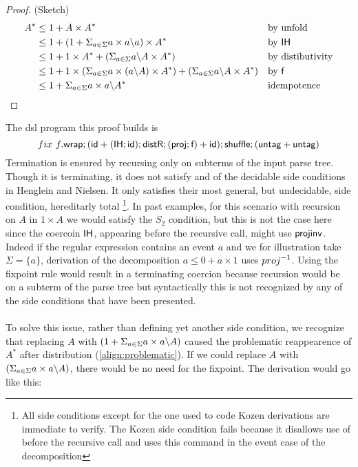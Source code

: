 \documentclass[a4paper,UKenglish,cleveref, autoref, thm-restate]{lipics-v2021}
\newcommand\mycomment[1]{}
\begin{document}
\begin{proof} (Sketch)
\begin{align}
A^* &\leq  1 + A \times A^* && \text{by unfold}\\
 &\leq 1 + (1 + \Sigma_{a \in \Sigma} a\times a \backslash a) \times A^* && \text{by } \textsf{IH}\\
 &\leq 1 + 1 \times A^* + (\Sigma_{a \in \Sigma} a \backslash A \times A^*) && \text{by distibutivity}\\
 &\leq 1 +  1 \times (\Sigma_{a \in \Sigma} a\times (a \backslash A)\times A^*) +  (\Sigma_{a \in \Sigma} a \backslash A \times A^*)  && \text{by } \textsf{f}  \\
 &\leq 1 + \Sigma_{a \in \Sigma} a\times a \backslash A^* && \text{idempotence} 
\end{align}
\end{proof}
The dsl program this proof builds is \mycomment{did not check details}
\[ \fix ~f.\dslcom{wrap};(\dslcom{id} + (\dslcom{IH};\dslcom {id});\dslcom{distR};(\dslcom{proj};\dslcom{f})+\dslcom{id});\dslcom{shuffle};(\dslcom{untag} + \dslcom{untag}) \]
Termination is ensured by recursing only on subterms of the input parse tree. Though it is terminating, it does not satisfy and of the decidable side conditions in Henglein and Nielsen. It only satisfies their most general, but undecidable, side condition, hereditarly total \footnote{All side conditions except for the one used to code Kozen derivations are immediate to verify. The Kozen side condition fails because it disallows use of  before the recursive call and  uses this command in the event case of the decomposition}.
In past examples, for this scenario with recursion on $A$ in $1 \times A$ we would satisfy the $S_2$ condition, but this is not the case here since the coercoin $\textsf{IH}$, appearing before the recursive call, might use $\textsf{projinv}$. Indeed if the regular expression contains an event $a$ and we for illustration take $\Sigma = \{a\}$, derivation of the decomposition $a \leq 0 + a \times 1 $ uses $\dslcominv{proj}$. Using the fixpoint rule would result in a terminating coercion because recursion would be on a subterm of the parse tree but syntactically this is not recognized by any of the side conditions that have been presented.\\\\
To solve this issue, rather than defining yet another side condition, we recognize that replacing $A$ with $(1 + \Sigma_{a \in \Sigma} a\times a \backslash A)$ caused the problematic reappearence of $A^*$ after distribution (\ref{align:problematic}). If we could replace $A$ with $(\Sigma_{a \in \Sigma} a\times a \backslash A)$, there would be no need for the fixpoint. The derivation would go like this:
\end{document}
